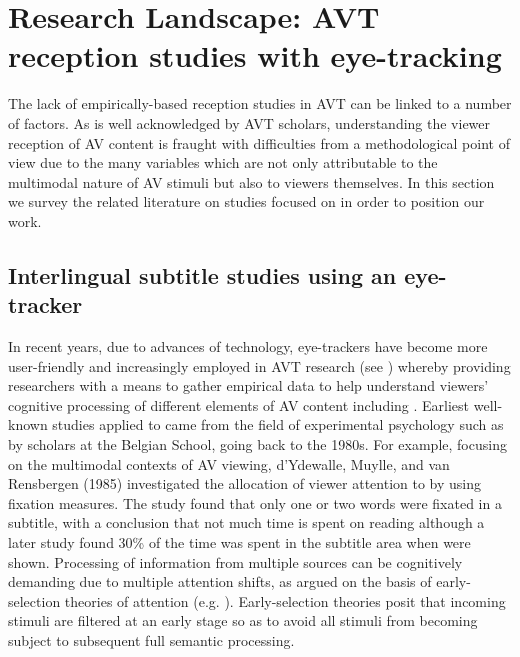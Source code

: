 \documentclass[output=paper]{langsci/langscibook}
\begin{document}
\section{Research Landscape: AVT reception studies with eye-tracking}

The lack of empirically-based reception studies in AVT can be linked to a number of factors. As is well acknowledged by AVT scholars, understanding the viewer reception of AV content is fraught with difficulties from a methodological point of view due to the many variables which are not only attributable to the multimodal nature of AV stimuli but also to viewers themselves.  In this section we survey the related literature on  studies focused on  in order to position our work.    

\subsection{Interlingual subtitle studies using an eye-tracker}

In recent years, due to advances of technology, eye-trackers have become more user-friendly and increasingly employed in AVT research (see \citealt{perego2012}) whereby providing researchers with a means to gather empirical data to help understand viewers' cognitive processing of different elements of AV content including . Earliest well-known  studies applied to  came from the field of experimental psychology such as by scholars at the Belgian School, going back to the 1980s. For example, focusing on the multimodal contexts of AV viewing, d'Ydewalle, Muylle, and van Rensbergen (1985) investigated the allocation of viewer attention to  by using fixation measures. The study found that only one or two words were fixated in a subtitle, with a conclusion that not much time is spent on reading  although a later study \citep{dydewalle1987} found 30\% of the time was spent in the subtitle area when  were shown. Processing of information from multiple sources can be cognitively demanding due to multiple attention shifts, as argued on the basis of early-selection theories of attention (e.g. \citealt{Treisman1968}). Early-selection theories posit that incoming stimuli are filtered at an early stage so as to avoid all stimuli from becoming subject to subsequent full semantic processing.  
\end{document}

